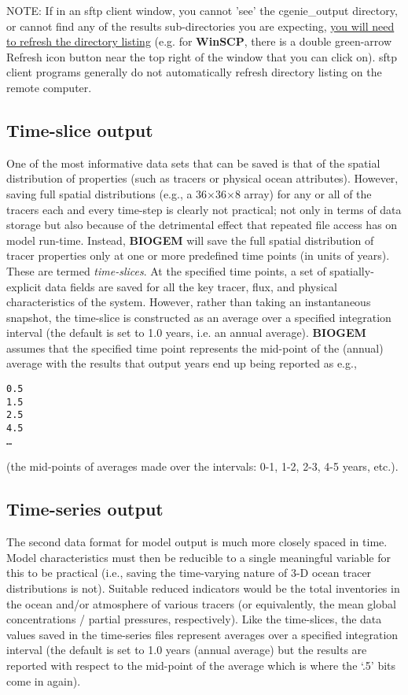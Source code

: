 \documentclass[11pt,fleqn]{book} %
\begin{document}
\noindent NOTE: If in an sftp client window, you cannot 'see' the \textsf{\footnotesize cgenie\_output} directory, or cannot find any of the results sub-directories you are expecting, \uline{you will need to refresh the directory listing} (e.g. for \textbf{WinSCP}, there is a double green-arrow \textsf{\footnotesize Refresh} icon button near the top right of the window that you can click on). sftp client programs generally do not automatically refresh directory listing on the remote computer.


\subsection{Time-slice output}

One of the most informative data sets that can be saved is that of the spatial distribution of properties (such as tracers or physical ocean attributes). However, saving full spatial distributions (e.g., a 36\(\times\)36\(\times\)8 array) for any or all of the tracers each and every time-step is clearly not practical; not only in terms of data storage but also because of the detrimental effect that repeated file access has on model run-time.
Instead, \textbf{BIOGEM} will save the full spatial distribution of tracer properties only at one or more predefined time points (in units of years). These are termed \textit{time-slices}. At the specified time points, a set of spatially-explicit data fields are saved for all the key tracer, flux, and physical characteristics of the system. However, rather than taking an instantaneous snapshot, the time-slice is constructed as an average over a specified integration interval (the default is set to 1.0 years, i.e. an annual average). \textbf{BIOGEM}  assumes that the specified time point represents the mid-point of the (annual) average with the results that output years end up being reported as e.g.,
\begin{verbatim}
0.5
1.5
2.5
4.5
…
\end{verbatim}
(the mid-points of averages made over the intervals: 0-1, 1-2, 2-3, 4-5 years, etc.).


\subsection{Time-series output}

The second data format for model output is much more closely spaced in time. Model characteristics must then be reducible to a single meaningful variable for this to be practical (i.e., saving the time-varying nature of 3-D ocean tracer distributions is not). Suitable reduced indicators would be the total inventories in the ocean and/or atmosphere of various tracers (or equivalently, the mean global concentrations / partial pressures, respectively). Like the time-slices, the data values saved in the time-series files represent averages over a specified integration interval (the default is set to 1.0 years (annual average) but the results are reported with respect to the mid-point of the average which is where the ‘.5’ bits come in again).
\end{document}
